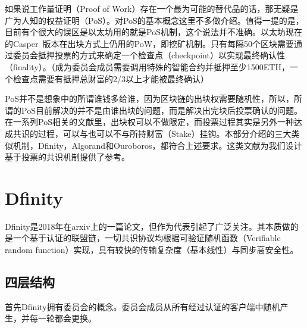 如果说工作量证明（Proof of Work）存在一个最为可能的替代品的话，那无疑是广为人知的权益证明（PoS）。对PoS的基本概念这里不多做介绍。值得一提的是，目前有个很大的误区是以太坊用的就是PoS机制，这个说法并不准确。以太坊现在的Casper~\cite{buterin2017casper}版本在出块方式上仍用的PoW，即挖矿机制。只有每隔50个区块需要通过委员会抵押投票的方式来确定一个检查点（checkpoint）以实现最终确认性（finality）。（成为委员会成员需要调用特殊的智能合约并抵押至少1500ETH，一个检查点需要有抵押总财富的2/3以上才能被最终确认）

PoS并不是想象中的所谓谁钱多给谁，因为区块链的出块权需要随机性，所以，所谓的PoS目前解决的并不是由谁出块的问题，而是解决出完块后投票确认的问题。在一系列PoS相关的文献里，出块权可以不做限定，而投票过程其实是另外一种达成共识的过程，可以与也可以不与所持财富（Stake）挂钩。本部分介绍的三大类似机制，Dfinity，Algorand和Ouroboros，都符合上述要求。这类文献为我们设计基于投票的共识机制提供了参考。

\section{Dfinity}
Dfinity是2018年在arxiv上的一篇论文，但作为代表引起了广泛关注。其本质做的是一个基于认证的联盟链，一切共识协议均根据可验证随机函数（Verifiable random function）实现，具有较快的传输复杂度（基本线性）与同步高安全性。
\subsection{四层结构}
首先Dfinity拥有委员会的概念。委员会成员从所有经过认证的客户端中随机产生，并每一轮都会更换。

